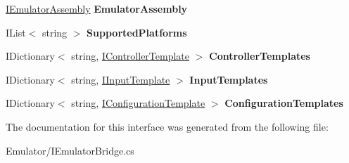 \begin{DoxyCompactItemize}
\item 
\hypertarget{interface_snowflake_1_1_emulator_1_1_i_emulator_bridge_a16b6fb49e7a8918e8008cf6a63c7ca61}{}\hyperlink{interface_snowflake_1_1_emulator_1_1_i_emulator_assembly}{I\+Emulator\+Assembly} {\bfseries Emulator\+Assembly}\label{interface_snowflake_1_1_emulator_1_1_i_emulator_bridge_a16b6fb49e7a8918e8008cf6a63c7ca61}

\item 
\hypertarget{interface_snowflake_1_1_emulator_1_1_i_emulator_bridge_aa9202ffa8300af600ea2936307c58df8}{}I\+List$<$ string $>$ {\bfseries Supported\+Platforms}\label{interface_snowflake_1_1_emulator_1_1_i_emulator_bridge_aa9202ffa8300af600ea2936307c58df8}

\item 
\hypertarget{interface_snowflake_1_1_emulator_1_1_i_emulator_bridge_a3230286b490dc33b3327b8a2a236b469}{}I\+Dictionary$<$ string, \hyperlink{interface_snowflake_1_1_emulator_1_1_input_1_1_i_controller_template}{I\+Controller\+Template} $>$ {\bfseries Controller\+Templates}\label{interface_snowflake_1_1_emulator_1_1_i_emulator_bridge_a3230286b490dc33b3327b8a2a236b469}

\item 
\hypertarget{interface_snowflake_1_1_emulator_1_1_i_emulator_bridge_a9314563179c8ea7ff50bbf030c667ca8}{}I\+Dictionary$<$ string, \hyperlink{interface_snowflake_1_1_emulator_1_1_input_1_1_i_input_template}{I\+Input\+Template} $>$ {\bfseries Input\+Templates}\label{interface_snowflake_1_1_emulator_1_1_i_emulator_bridge_a9314563179c8ea7ff50bbf030c667ca8}

\item 
\hypertarget{interface_snowflake_1_1_emulator_1_1_i_emulator_bridge_a58d58675778f25f34bcaa5cf512c60ae}{}I\+Dictionary$<$ string, \hyperlink{interface_snowflake_1_1_emulator_1_1_configuration_1_1_i_configuration_template}{I\+Configuration\+Template} $>$ {\bfseries Configuration\+Templates}\label{interface_snowflake_1_1_emulator_1_1_i_emulator_bridge_a58d58675778f25f34bcaa5cf512c60ae}

\end{DoxyCompactItemize}


The documentation for this interface was generated from the following file\+:\begin{DoxyCompactItemize}
\item 
Emulator/I\+Emulator\+Bridge.\+cs\end{DoxyCompactItemize}
